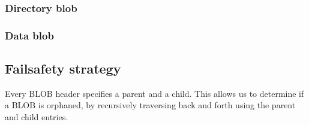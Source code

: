 \documentclass{article}
\begin{document}
\subsubsection{Directory blob}
\vspace{0.3cm}
\subsubsection{Data blob}
\vspace{0.3cm}

\subsection{Failsafety strategy}
Every BLOB header specifies a parent and a child. This allows us to determine if a BLOB is orphaned, by recursively traversing back and forth using the parent and child entries.
\end{document}

